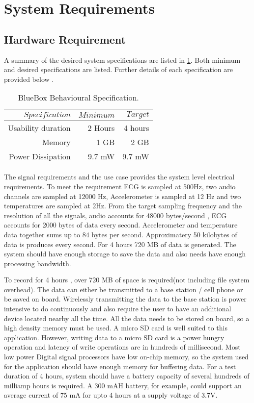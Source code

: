 \section{System Requirements}\label{system requirements}
\subsection{Hardware Requirement}

\hspace{10mm}A summary of the desired system specifications are listed in \ref{table:Behavioural_specs}. Both minimum and desired specifications are listed. Further details of each specification are provided below .
\begin{table}
	\centering
	\begin{tabular}{|r |r|r|}
		\hline
		$Specification$ & $Minimum$ & $Target$ \\
		\hline
		Usability duration  &  2 Hours & 4 hours \\
		Memory & 1 GB & 2 GB \\
		Power Dissipation & 9.7 mW & 9.7 mW \\
		\hline
	\end{tabular}
	\caption{BlueBox Behavioural Specification.}
	\label{table:Behavioural_specs}
\end{table}

The signal requirements and the use case  provides the system level electrical requirements.  To meet the requirement ECG is sampled at 500Hz, two audio channels are sampled at 12000 Hz, Accelerometer is sampled at 12 Hz and two temperatures are sampled at 2Hz. From the target sampling frequency and the resolution of all the signals, audio accounts for 48000 bytes/second , ECG accounts for 2000 bytes of data every second. Accelerometer and temperature data together sums up to 84 bytes per second. Approximatery 50 kilobytes of data is produces every second. For 4 hours 720 MB of data is generated. The system should have enough storage to save the data and also needs have enough processing bandwidth. 

\hspace{10mm} To record for 4 hours , over 720 MB of space is required(not including file system overhead). The data can either be transmitted to a base station / cell phone or be saved on board. Wirelessly transmitting the data to the base station is power intensive to do continuously and also require the user to have an additional device located nearby all the time. 
All the data needs to be stored on board, so a high density memory must be used. A micro SD card is well suited to this application. However, writing data to a micro SD card is a power hungry operation and latency of write operations are in hundreds of millisecond. Most low power Digital signal processors have low on-chip memory, so the system used for the application should have enough memory for buffering data. For a test duration of 4 hours, system should have a battery capacity of several hundreds of milliamp hours is required. A 300 mAH battery, for example, could support an average current of 75 mA for upto 4 hours at a supply voltage of 3.7V. 

